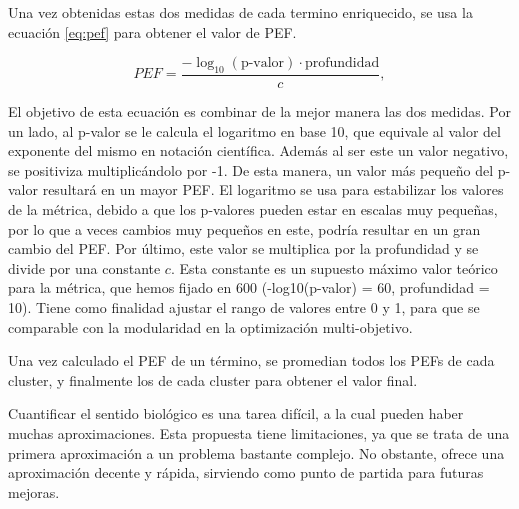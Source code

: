 \begin{itemize}
    Una vez obtenidas estas dos medidas de cada termino enriquecido, se usa la ecuación \ref{eq:pef} para obtener el valor de PEF.

    \begin{equation}
    \label{eq:pef}
    PEF = \frac{-\log_{10}(\text{p-valor}) \cdot \text{profundidad}}{c},
    \end{equation}

    El objetivo de esta ecuación es combinar de la mejor manera las dos medidas. Por un lado, al p-valor se le calcula el logaritmo en base 10, que equivale al valor del exponente del mismo en notación científica. Además al ser este un valor negativo, se positiviza multiplicándolo por -1. De esta manera, un valor más pequeño del p-valor resultará en un mayor PEF. El logaritmo se usa para estabilizar los valores de la métrica, debido a que los p-valores pueden estar en escalas muy pequeñas, por lo que a veces cambios muy pequeños en este, podría resultar en un gran cambio del PEF. Por último, este valor se multiplica por la profundidad y se divide por una constante $c$. Esta constante es un supuesto máximo valor teórico para la métrica, que hemos fijado en 600 (-log10(p-valor) = 60, profundidad = 10). Tiene como finalidad ajustar el rango de valores entre 0 y 1, para que se comparable con la modularidad en la optimización multi-objetivo.

    Una vez calculado el PEF de un término, se promedian todos los PEFs de cada cluster, y finalmente los de cada cluster para obtener el valor final.

    Cuantificar el sentido biológico es una tarea difícil, a la cual pueden haber muchas aproximaciones. Esta propuesta tiene limitaciones, ya que se trata de una primera aproximación a un problema bastante complejo. No obstante, ofrece una aproximación decente y rápida, sirviendo como punto de partida para futuras mejoras.
    
\end{itemize}
